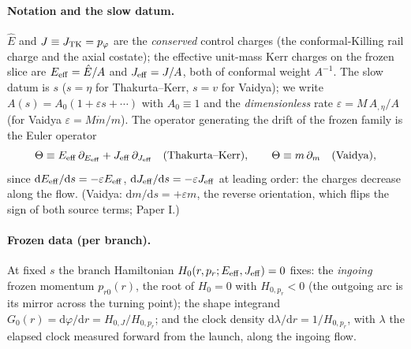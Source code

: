 \documentclass[12pt]{iopart}
\theoremstyle{plain}
\theoremstyle{definition}
\theoremstyle{remark}
\newcommand{\Ehat}{\hat E}
\newcommand{\dd}{\mathrm{d}}
\begin{document}
\paragraph{Notation and the slow datum.} $\Ehat$ and $J\equiv J_{\rm TK}=p_\varphi$ are
the \emph{conserved} control charges (the conformal-Killing rail charge and the axial costate); the effective
unit-mass Kerr charges on the frozen slice are $E_{\rm eff}=\Ehat/A$ and
$J_{\rm eff}=J/A$, both of conformal weight $A^{-1}$. The slow datum is $s$ ($s=\eta$ for
Thakurta--Kerr, $s=v$ for Vaidya); we write $A(s)=A_0(1+\varepsilon s+\cdots)$ with
$A_0\equiv1$ and the \emph{dimensionless} rate $\varepsilon=M\,A_{,\eta}/A$ (for Vaidya
$\varepsilon=M\dot m/m$). The operator generating the drift of the frozen family is the
Euler operator
\begin{equation}
    \Theta\equiv E_{\rm eff}\,\partial_{E_{\rm eff}}+J_{\rm eff}\,\partial_{J_{\rm eff}}
    \quad(\text{Thakurta--Kerr}),\qquad
    \Theta\equiv m\,\partial_m\quad(\text{Vaidya}),
    \label{eq:theta-op}
\end{equation}
since $\dd E_{\rm eff}/\dd s=-\varepsilon E_{\rm eff}$, $\dd J_{\rm eff}/\dd s=-\varepsilon
J_{\rm eff}$ at leading order: the charges decrease along the flow. (Vaidya:
$\dd m/\dd s=+\varepsilon m$, the reverse orientation, which flips the sign of both source
terms; Paper I.)

\paragraph{Frozen data (per branch).} At fixed $s$ the branch Hamiltonian
$H_0(r,p_r;E_{\rm eff},J_{\rm eff})=0$ fixes: the \emph{ingoing} frozen momentum
$p_{r0}(r)$, the root of $H_0=0$ with $H_{0,p_r}<0$ (the outgoing arc is its mirror
across the turning point); the shape integrand $G_0(r)=\dd\varphi/\dd r=H_{0,J}/H_{0,p_r}$;
and the clock density $\dd\lambda/\dd r=1/H_{0,p_r}$, with $\lambda$ the elapsed clock
measured forward from the launch, along the ingoing flow.
\end{document}
